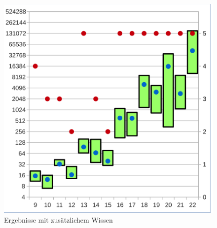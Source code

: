 \begin{figure}[!h]
\begin{minipage}[c]{0.45\textwidth}
  \includegraphics[scale=0.55]{images/data_know_xor}
  \end{minipage}
  \caption{Ergebnisse mit zusätzlichem Wissen}
  \label{fig:data_know}
\end{figure}